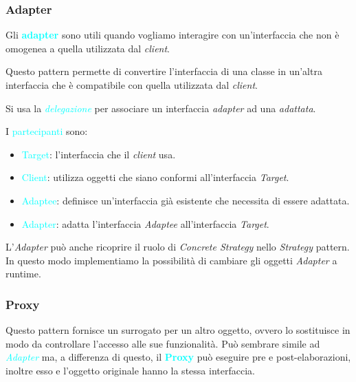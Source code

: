 \subsubsection{Adapter}

Gli \textbf{\textcolor{cyan}{adapter}} sono utili
quando vogliamo interagire con un'interfaccia che non
è omogenea a quella utilizzata dal \emph{client}.

Questo pattern permette di convertire l'interfaccia di una classe
in un'altra interfaccia che è compatibile con quella utilizzata dal \emph{client}.

Si usa la \emph{\textcolor{cyan}{delegazione}} per associare un interfaccia
\emph{adapter} ad una \emph{adattata}.

I \textcolor{cyan}{partecipanti} sono:
\begin{itemize}
    \item \textcolor{cyan}{Target}: l'interfaccia che il \emph{client} usa.
    \item \textcolor{cyan}{Client}: utilizza oggetti che siano conformi all'interfaccia \emph{Target}.
    \item \textcolor{cyan}{Adaptee}: definisce un'interfaccia già esistente che necessita di essere adattata.
    \item \textcolor{cyan}{Adapter}: adatta l'interfaccia \emph{Adaptee} all'interfaccia \emph{Target}.
\end{itemize}

L'\emph{Adapter} può anche ricoprire il ruolo di \emph{Concrete Strategy}
nello \emph{Strategy} pattern. In questo modo implementiamo la possibilità di cambiare
gli oggetti \emph{Adapter} a runtime.

\subsubsection{Proxy}

Questo pattern fornisce un surrogato per un altro oggetto, ovvero lo sostituisce
in modo da controllare l'accesso alle sue funzionalità. Può sembrare simile
ad \emph{\textcolor{cyan}{Adapter}} ma, a differenza di questo, il \textbf{\textcolor{cyan}{Proxy}}
può eseguire pre e post-elaborazioni, inoltre esso e l'oggetto originale hanno la stessa interfaccia.

